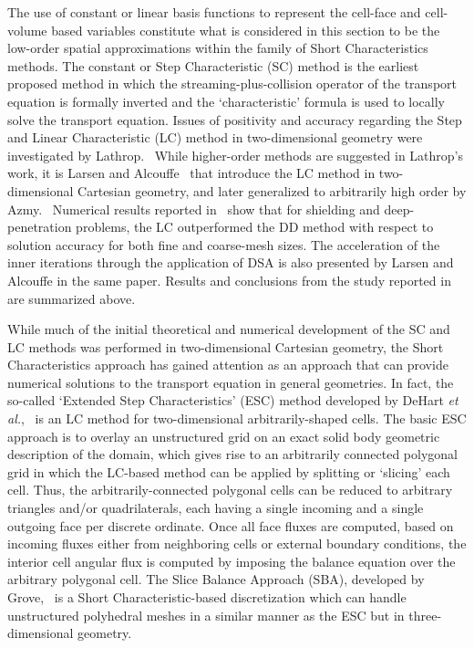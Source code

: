 The use of constant or linear basis functions to represent the cell-face and cell-volume based variables constitute what is considered in this section to be the low-order spatial approximations within the family of Short Characteristics methods. The constant or Step Characteristic (SC) method is the earliest proposed method in which the streaming-plus-collision operator of the transport equation is formally inverted and the ‘characteristic’ formula is used to locally solve the transport equation. Issues of positivity and accuracy regarding the Step and Linear Characteristic (LC) method in two-dimensional geometry were investigated by Lathrop.~\cite{Lathrop1969} While higher-order methods are suggested in Lathrop’s work, it is Larsen and Alcouffe~\cite{Larsen1981} that introduce the LC method in two-dimensional Cartesian geometry, and later generalized to arbitrarily high order by Azmy.~\cite{Azmy1992} Numerical results reported in~\cite{Larsen1981} show that for shielding and deep-penetration problems, the LC outperformed the DD method with respect to solution accuracy for both fine and coarse-mesh sizes. The acceleration of the inner iterations through the application of DSA is also presented by Larsen and Alcouffe in the same paper. Results and conclusions from the study reported in~\cite{Azmy1992} are summarized above.

While much of the initial theoretical and numerical development of the SC and LC methods was performed in two-dimensional Cartesian geometry, the Short Characteristics approach has gained attention as an approach that can provide numerical solutions to the transport equation in general geometries. In fact, the so-called ‘Extended Step Characteristics’ (ESC) method developed by DeHart \textit{et al.},~\cite{DeHart1994} is an LC method for two-dimensional arbitrarily-shaped cells. The basic ESC approach is to overlay an unstructured grid on an exact solid body geometric description of the domain, which gives rise to an arbitrarily connected polygonal grid in which the LC-based method can be applied by splitting or ‘slicing’ each cell. Thus, the arbitrarily-connected polygonal cells can be reduced to arbitrary triangles and/or quadrilaterals, each having a single incoming and a single outgoing face per discrete ordinate. Once all face fluxes are computed, based on incoming fluxes either from neighboring cells or external boundary conditions, the interior cell angular flux is computed by imposing the balance equation over the arbitrary polygonal cell. The Slice Balance Approach (SBA), developed by Grove,~\cite{Grove2005} is a Short Characteristic-based discretization which can handle unstructured polyhedral meshes in a similar manner as the ESC but in three-dimensional geometry.

